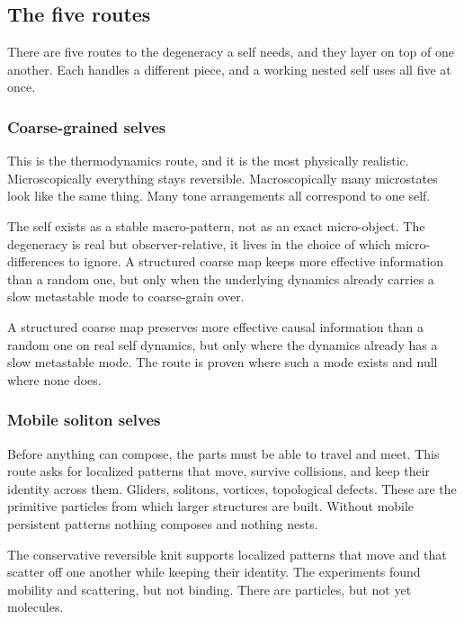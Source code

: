 \subsection{The five routes}

There are five routes to the degeneracy a self needs, and they layer on top of one another. Each handles a different piece, and a working nested self uses all five at once.

\subsubsection{Coarse-grained selves}

This is the thermodynamics route, and it is the most physically realistic. Microscopically everything stays reversible. Macroscopically many microstates look like the same thing. Many tone arrangements all correspond to one self.

The self exists as a stable macro-pattern, not as an exact micro-object. The degeneracy is real but observer-relative, it lives in the choice of which micro-differences to ignore. A structured coarse map keeps more effective information than a random one, but only when the underlying dynamics already carries a slow metastable mode to coarse-grain over.

\begin{result}
A structured coarse map preserves more effective causal information than a random one on real self dynamics, but only where the dynamics already has a slow metastable mode. The route is proven where such a mode exists and null where none does.
\end{result}

\subsubsection{Mobile soliton selves}

Before anything can compose, the parts must be able to travel and meet. This route asks for localized patterns that move, survive collisions, and keep their identity across them. Gliders, solitons, vortices, topological defects. These are the primitive particles from which larger structures are built. Without mobile persistent patterns nothing composes and nothing nests.

\begin{result}
The conservative reversible knit supports localized patterns that move and that scatter off one another while keeping their identity. The experiments found mobility and scattering, but not binding. There are particles, but not yet molecules.
\end{result}

